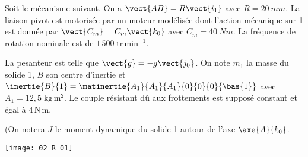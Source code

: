 \normaltrue
\correctionfalse


\setcounter{question}{0}%
\ifcorrection
\else
{}
\fi

\ifprof
\else
Soit le mécanisme suivant. On a $\vect{AB}=R\vect{i_1}$ avec $R=\SI{20}{mm}$. La liaison pivot est motorisée par un moteur modélisée dont l'action mécanique sur \textbf{1} est donnée par $\vect{C_m}=C_m \vect{k_0}$ avec $C_m = \SI{40}{Nm}$. La fréquence de rotation nominale est de $1\,500\; \text{tr}\,\text{min}^{-1}$. 

 La pesanteur est telle que $\vect{g}=-g\vect{j_0}$.
On note $m_1$ la masse du solide 1, $B$ son centre d'inertie et $\inertie{B}{1}=\matinertie{A_1}{A_1}{A_1}{0}{0}{0}{\bas{1}}$ avec $A_1 = 12,5\; \text{kg}\,\text{m}^2$.
 Le couple résistant dû aux frottements est supposé constant et égal à $4\, \text{N} \, \text{m}$.

(On notera $J$ le moment dynamique du solide 1 autour de l'axe $\axe{A}{k_0}$.

\begin{marginfigure}
\texttt{[image: 02\_R\_01]}
\end{marginfigure}

\fi


\ifprof
\else
\fi

\ifprof
\else
\fi



\ifprof
\else


\fi